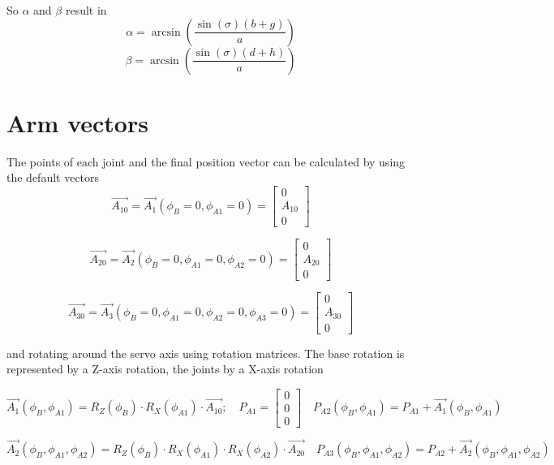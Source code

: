 \documentclass{article}
\newcommand{\vect}[1]{\left[\begin{array}{c}#1\end{array}\right]}
\begin{document}
    So $\alpha$ and $\beta$ result in 
        \begin{equation}
            \alpha = \arcsin(\frac{\sin(\sigma)(b + g)}{a})
        \end{equation}
        \begin{equation}
            \beta = \arcsin(\frac{\sin(\sigma)(d + h)}{a})
        \end{equation}

\section{Arm vectors}
    The points of each joint and the final position vector can be calculated by using the default vectors
        \begin{equation}
            \vec{A_{10}} = \vec{A_1}(\phi_B = 0, \phi_{A1} = 0) = \vect{0 \\ A_{10} \\ 0}
        \end{equation}
    
        \begin{equation}
            \vec{A_{20}} = \vec{A_2}(\phi_B = 0, \phi_{A1} = 0, \phi_{A2} = 0) = \vect{0 \\ A_{20} \\ 0}
        \end{equation}
    
        \begin{equation}
            \vec{A_{30}} = \vec{A_3}(\phi_B = 0, \phi_{A1} = 0, \phi_{A2} = 0, \phi_{A3} = 0) = \vect{ 0 \\ A_{30} \\ 0}
        \end{equation}
    
    and rotating around the servo axis using rotation matrices. The base rotation is represented by a Z-axis rotation, the joints by a X-axis rotation
    
        \begin{equation}
            \vec{A_1}(\phi_B, \phi_{A1}) = R_Z(\phi_B) \cdot R_X(\phi_{A1}) \cdot \vec{A_{10}}; \quad
            P_{A1} = \vect{0 \\ 0 \\ 0} \quad
            P_{A2}(\phi_B, \phi_{A1}) = P_{A1} + \vec{A_1}(\phi_B, \phi_{A1})
        \end{equation}
        
        \begin{equation}
            \vec{A_2}(\phi_B, \phi_{A1}, \phi_{A2}) = R_Z(\phi_B) \cdot R_X(\phi_{A1}) \cdot R_X(\phi_{A2}) \cdot \vec{A_{20}} \quad
            P_{A3}(\phi_B, \phi_{A1}, \phi_{A2}) = P_{A2} + \vec{A_2}(\phi_B, \phi_{A1}, \phi_{A2})
        \end{equation}
        
\end{document}
